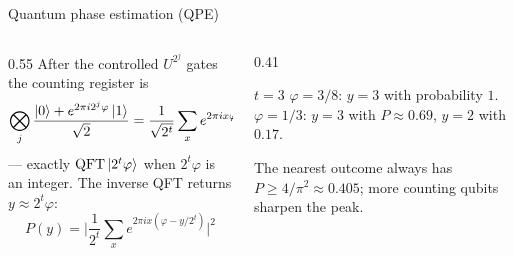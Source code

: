 \documentclass[aspectratio=169,11pt]{beamer}
\begin{document}
\begin{frame}[label=fQPE]{Quantum phase estimation (QPE)}
  \begin{columns}[T]
    \begin{column}{0.55\textwidth}
      \small
      After the controlled $U^{2^j}$ gates the counting register is
      \[ \bigotimes_j\frac{\ket0 + e^{2\pi i2^j\varphi}\ket1}{\sqrt2} = \frac{1}{\sqrt{2^t}}\sum_xe^{2\pi ix\varphi}\ket x \]
      --- exactly $\mathrm{QFT}\ket{2^t\varphi}$ when $2^t\varphi$ is an integer. The inverse QFT returns $y \approx 2^t\varphi$:
      \[ P(y) = \Big|\frac{1}{2^t}\sum_xe^{2\pi ix(\varphi - y/2^t)}\Big|^2 \]
    \end{column}
    \begin{column}{0.41\textwidth}
      \begin{exampleblock}{$t = 3$}
        \small
        $\varphi = 3/8$: $y = 3$ with probability $1$.\\
        $\varphi = 1/3$: $y = 3$ with $P \approx 0.69$, $y = 2$ with $0.17$.
      \end{exampleblock}
      \scriptsize The nearest outcome always has $P \ge 4/\pi^2 \approx 0.405$; more counting qubits sharpen the peak.
    \end{column}
  \end{columns}
\end{frame}
\end{document}
